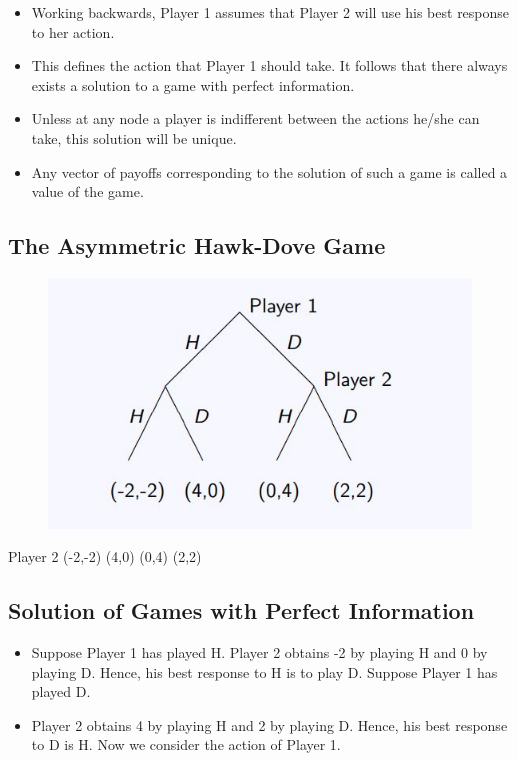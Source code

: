 \documentclass[]{report}
\begin{document}
\begin{itemize}
	\item Working backwards, Player 1 assumes that Player 2 will use his
	best response to her action.
	\item This defines the action that Player 1 should take.
	It follows that there always exists a solution to a game with perfect
	information.
	\item  Unless at any node a player is indifferent between the
	actions he/she can take, this solution will be unique.
	\item 	Any vector of payoffs corresponding to the solution of such a game
	is called a value of the game.
\end{itemize}

\newpage
\subsection{The Asymmetric Hawk-Dove Game}



\begin{figure}[h!]
\centering
\includegraphics[width=0.6\linewidth]{images/DR5-Slide36}
\caption{}
\label{fig:DR5-Slide36}
\end{figure}

Player 2
(-2,-2) (4,0) (0,4) (2,2)

\subsection{Solution of Games with Perfect Information}
\begin{itemize}
	\item Suppose Player 1 has played H. Player 2 obtains -2 by playing H
	and 0 by playing D. Hence, his best response to H is to play D.
	Suppose Player 1 has played D. 
	\item Player 2 obtains 4 by playing H
	and 2 by playing D. Hence, his best response to D is H.
	Now we consider the action of Player 1.
\end{itemize}
\end{document}

